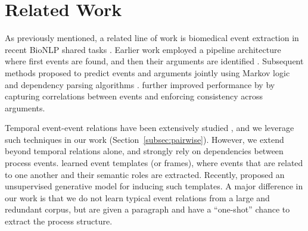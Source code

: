 \section{Related Work}
As  previously mentioned, a related line of work is biomedical event extraction in recent BioNLP shared tasks \cite{kim09,kim11}. 
Earlier work employed a pipeline architecture where first events are found, and then their arguments are identified \cite{Miwa10,Bjorne11}. Subsequent methods proposed to predict events and arguments jointly using Markov logic \cite{Poon10} and dependency parsing algorithms \cite{Mcclosky11}.  further improved performance by by capturing correlations between events and enforcing consistency across arguments.



Temporal event-event relations have been extensively studied \cite{Chambers08,Yoshikawa09,Denis11,Do12,Mcclosky12,DSouzaNg:13a}, and we leverage such techniques in our work (Section~\ref{subsec:pairwise}). However, we extend beyond temporal relations alone, and strongly rely on dependencies between process events.  learned event templates (or frames), where events that are related to one another and their semantic roles are extracted. Recently,  proposed an unsupervised generative model for inducing such templates. A major difference in our work is that we do not learn typical event relations from a large and redundant corpus, but are given a paragraph and have a ``one-shot'' chance to extract the process structure.

